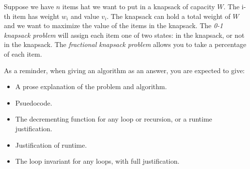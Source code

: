 \documentclass{article}
\begin{document}

\nextprob
Suppose we have $n$ items hat we want to put in a knapsack of capacity $W$.  The i-th item has
weight $w_i$ and value $v_i$.  The knapsack can hold a total weight of $W$ and
we want to maximize the value of the items in the knapsack.
The \emph{0-1 knapsack problem} will assign each item one of two states: in the
knapsack, or not in the knapsack.  The \emph{fractional knapsack problem} allows
you to take a percentage of each item.

As a reminder, when giving an algorithm as an answer, you
are expected to give:
\begin{itemize}
    \item A prose explanation of the problem and algorithm.
    \item Psuedocode.
    \item The decrementing function for any loop or recursion, or a runtime
        justification.
    \item Justification of runtime.
    \item The loop invariant for any loops, with full justification.
\end{itemize}
\end{document}
